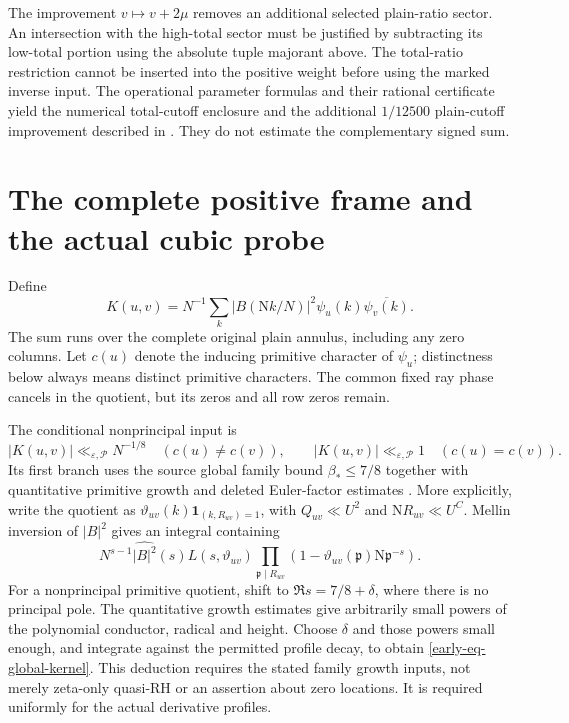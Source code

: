 \documentclass[11pt]{article}
\theoremstyle{definition}
\newcommand{\N}{\mathrm N}
\newcommand{\eps}{\varepsilon}
\newcommand{\lls}{\ll_{\eps,\mathcal P}}
\begin{document}
The improvement \(v\mapsto v+2\mu\) removes an additional selected
plain-ratio sector.  An intersection with the high-total sector must
be justified by subtracting its low-total portion using the absolute
tuple majorant above.  The total-ratio restriction cannot be inserted
into the positive weight before using the marked inverse input.
The operational parameter formulas and their rational certificate
yield the numerical total-cutoff enclosure and the additional
\(1/12500\) plain-cutoff improvement described in \cite{n1}.
They do not estimate the complementary signed sum.

\section{The complete positive frame and the actual cubic probe}
\label{early-sec-frame}

Define
\[
 K(u,v)=N^{-1}\sum_k |B(\N k/N)|^2
                     \psi_u(k)\overline{\psi_v(k)}.
\]
The sum runs over the complete original plain annulus, including any
zero columns.  Let \(c(u)\) denote the inducing primitive character
of \(\psi_u\); distinctness below always means distinct primitive
characters.  The common fixed ray phase cancels in the quotient,
but its zeros and all row zeros remain.

The conditional nonprincipal input is
\begin{equation}\label{early-eq-global-kernel}
 |K(u,v)|\lls N^{-1/8}\quad(c(u)\ne c(v)),\qquad
 |K(u,v)|\lls1\quad(c(u)=c(v)).
\end{equation}
Its first branch uses the source global family bound
\(\beta_*\le7/8\) together with quantitative primitive growth and
deleted Euler-factor estimates \cite{n2,amplification}.
More explicitly, write the quotient as
\(\vartheta_{uv}(k)\mathbf1_{(k,R_{uv})=1}\), with
\(Q_{uv}\ll U^2\) and \(\N R_{uv}\ll U^C\).
Mellin inversion of \(|B|^2\) gives an integral containing
\[
 N^{s-1}\widehat{|B|^2}(s)L(s,\vartheta_{uv})
 \prod_{\mathfrak p\mid R_{uv}}
       (1-\vartheta_{uv}(\mathfrak p)\N\mathfrak p^{-s}).
\]
For a nonprincipal primitive quotient, shift to
\(\Re s=7/8+\delta\), where there is no principal pole.
The quantitative growth estimates give arbitrarily small powers of the
polynomial conductor, radical and height.  Choose \(\delta\) and those
powers small enough, and integrate against the permitted profile
decay, to obtain \eqref{early-eq-global-kernel}.
This deduction requires the stated family growth inputs, not merely
zeta-only quasi-RH or an assertion about zero locations.
It is required uniformly for the actual derivative profiles.
\end{document}
